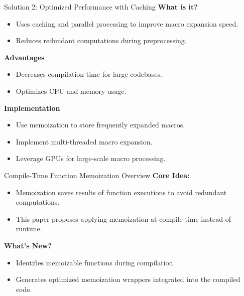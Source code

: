 \documentclass{beamer}
\begin{document}
\begin{frame}{Solution 2: Optimized Performance with Caching}
    \textbf{What is it?}
    \begin{itemize}
        \item Uses caching and parallel processing to improve macro expansion speed.
        \item Reduces redundant computations during preprocessing.
    \end{itemize}
    \textbf{Advantages}
    \begin{itemize}
        \item Decreases compilation time for large codebases.
        \item Optimizes CPU and memory usage.
    \end{itemize}
    \textbf{Implementation}
    \begin{itemize}
        \item Use memoization to store frequently expanded macros.
        \item Implement multi-threaded macro expansion.
        \item Leverage GPUs for large-scale macro processing.
    \end{itemize}
\end{frame}
\begin{frame}{Compile-Time Function Memoization Overview}
    \textbf{Core Idea:}
    \begin{itemize}
        \item Memoization saves results of function executions to avoid redundant computations.
        \item This paper proposes applying memoization at compile-time instead of runtime.
    \end{itemize}
    \vspace{0.3cm}
    \textbf{What’s New?}
    \begin{itemize}
        \item Identifies memoizable functions during compilation.
        \item Generates optimized memoization wrappers integrated into the compiled code.
    \end{itemize}
\end{frame}
\end{document}

